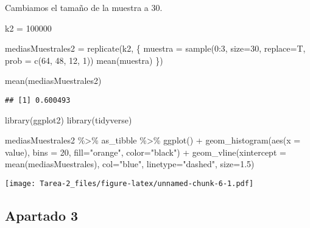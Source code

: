 \documentclass[
]{article}
\newenvironment{Shaded}{\begin{snugshade}}{\end{snugshade}}
\newcommand{\AttributeTok}[1]{\textcolor[rgb]{0.77,0.63,0.00}{#1}}
\newcommand{\DecValTok}[1]{\textcolor[rgb]{0.00,0.00,0.81}{#1}}
\newcommand{\FloatTok}[1]{\textcolor[rgb]{0.00,0.00,0.81}{#1}}
\newcommand{\FunctionTok}[1]{\textcolor[rgb]{0.00,0.00,0.00}{#1}}
\newcommand{\NormalTok}[1]{#1}
\newcommand{\OtherTok}[1]{\textcolor[rgb]{0.56,0.35,0.01}{#1}}
\newcommand{\SpecialCharTok}[1]{\textcolor[rgb]{0.00,0.00,0.00}{#1}}
\newcommand{\StringTok}[1]{\textcolor[rgb]{0.31,0.60,0.02}{#1}}
\begin{document}
Cambiamos el tamaño de la muestra a 30.

\begin{Shaded}
\begin{Highlighting}[]
\NormalTok{k2 }\OtherTok{=} \DecValTok{100000}

\NormalTok{mediasMuestrales2 }\OtherTok{=} \FunctionTok{replicate}\NormalTok{(k2, \{ }
\NormalTok{  muestra }\OtherTok{=} \FunctionTok{sample}\NormalTok{(}\DecValTok{0}\SpecialCharTok{:}\DecValTok{3}\NormalTok{, }\AttributeTok{size=}\DecValTok{30}\NormalTok{, }\AttributeTok{replace=}\NormalTok{T, }\AttributeTok{prob =} \FunctionTok{c}\NormalTok{(}\DecValTok{64}\NormalTok{, }\DecValTok{48}\NormalTok{, }\DecValTok{12}\NormalTok{, }\DecValTok{1}\NormalTok{))}
  \FunctionTok{mean}\NormalTok{(muestra)}
\NormalTok{\})}

\FunctionTok{mean}\NormalTok{(mediasMuestrales2)}
\end{Highlighting}
\end{Shaded}

\begin{verbatim}
## [1] 0.600493
\end{verbatim}

\begin{Shaded}
\begin{Highlighting}[]
\FunctionTok{library}\NormalTok{(ggplot2)}
\FunctionTok{library}\NormalTok{(tidyverse)}

\NormalTok{mediasMuestrales2 }\SpecialCharTok{\%\textgreater{}\%}
\NormalTok{  as\_tibble }\SpecialCharTok{\%\textgreater{}\%}
\FunctionTok{ggplot}\NormalTok{() }\SpecialCharTok{+}
  \FunctionTok{geom\_histogram}\NormalTok{(}\FunctionTok{aes}\NormalTok{(}\AttributeTok{x =}\NormalTok{ value), }\AttributeTok{bins =} \DecValTok{20}\NormalTok{, }\AttributeTok{fill=}\StringTok{"orange"}\NormalTok{, }\AttributeTok{color=}\StringTok{"black"}\NormalTok{) }\SpecialCharTok{+}
  \FunctionTok{geom\_vline}\NormalTok{(}\AttributeTok{xintercept =} \FunctionTok{mean}\NormalTok{(mediasMuestrales),}
             \AttributeTok{col=}\StringTok{"blue"}\NormalTok{, }\AttributeTok{linetype=}\StringTok{"dashed"}\NormalTok{, }\AttributeTok{size=}\FloatTok{1.5}\NormalTok{)}
\end{Highlighting}
\end{Shaded}

\texttt{[image: Tarea-2\_files/figure-latex/unnamed-chunk-6-1.pdf]}

\hypertarget{apartado-3}{%
\subsection{Apartado 3}\label{apartado-3}}
\end{document}
